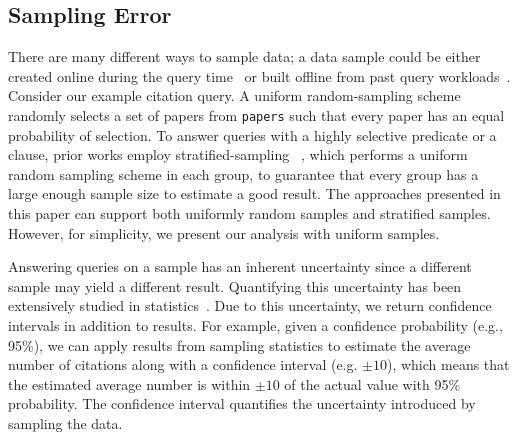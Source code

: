 \subsection{Sampling Error}\label{subsec:saqp}
There are many different ways to sample data; a data sample could be either created online during the query time~\cite{DBLP:conf/sigmod/HellersteinHW97,DBLP:journals/pvldb/PansareBJC11,DBLP:conf/sigmod/CondieCAHGTES10,DBLP:journals/pvldb/WuJOT09} or built offline from past query workloads~\cite{DBLP:conf/eurosys/AgarwalMPMMS13,DBLP:conf/sigmod/AcharyaGPR99,DBLP:journals/tods/ChaudhuriDN07,DBLP:conf/sigmod/BabcockCD03}.  
Consider our example citation query.
A uniform random-sampling scheme randomly selects a set of papers from \texttt{papers} such that every paper has an equal probability of selection.
To answer queries with a highly selective predicate or a \groupby clause, prior works employ stratified-sampling ~\cite{DBLP:conf/sigmod/HellersteinHW97,DBLP:conf/sigmod/AcharyaGP00,DBLP:conf/eurosys/AgarwalMPMMS13}, which performs a uniform random sampling scheme in each group, to guarantee that every group has a large enough sample size to estimate a good result. 
The approaches presented in this paper can support both uniformly random samples and stratified samples.
However, for simplicity, we present our analysis with uniform samples.

Answering queries on a sample has an inherent uncertainty since a different sample may yield a different result.
Quantifying this uncertainty has been extensively studied in statistics~\cite{lohr2010sampling}.
Due to this uncertainty, we return confidence intervals in addition to results.
For example, given a confidence probability (e.g., 95\%), we can apply results from sampling statistics to estimate the average number of citations along with a confidence interval (e.g. $\pm10$), which means that the estimated average number is within $\pm10$ of the actual value with 95\% probability.
The confidence interval quantifies the uncertainty introduced by sampling the data.





 
